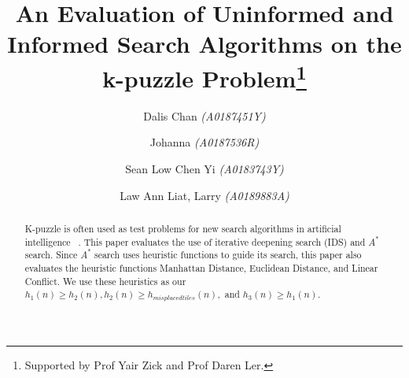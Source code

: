 \documentclass[runningheads]{llncs}
\begin{document}
%
\title{An Evaluation of Uninformed and Informed Search Algorithms on the k-puzzle Problem\thanks{Supported by Prof Yair Zick and Prof Daren Ler.}}
%
%
\author{Dalis Chan \textit{(A0187451Y)} \and
Johanna \textit{(A0187536R)} \and
Sean Low Chen Yi \textit{(A0183743Y)} \and 
Law Ann Liat, Larry \textit{(A0189883A)}}

%
%

%
\maketitle              %
%
\begin{abstract}
K-puzzle is often used as test problems for new search algorithms in artificial intelligence ~\cite[p71]{stuart_russell_artifical_2010}. 
This paper evaluates the use of iterative deepening search (IDS) and \( A^* \) search. 
Since \( A^* \) search uses heuristic functions to guide its search, this paper also evaluates the heuristic functions Manhattan Distance, Euclidean Distance, and Linear Conflict. We use these heuristics as our \(h_1(n) \geq h_2(n), h_2(n) \geq h_{misplaced tiles}(n),\)  and \(h_3(n) \geq h_1(n) \).
\end{abstract}
%
%
%
\end{document}
